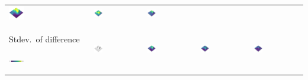 \documentclass[prodmode,acmtochi]{acmsmall} %
\begin{document}
\begin{table}
{\begin{tabular}{m{} m{} m{} m{} m{}}
\includegraphics[width=0.19\textwidth]{images/render_3d/stdev_dem_1.png} &
\includegraphics[width=0.19\textwidth]{images/render_3d/stdev_dem_2.png} &
\includegraphics[width=0.19\textwidth]{images/render_3d/stdev_dem_3.png}\\
%
Stdev.~of difference \par \vspace{0.5em} \includegraphics[width=0.19\textwidth]{images/legends/stdev_diff_legend.pdf} & 
\includegraphics[width=0.19\textwidth]{images/render_3d/dem_difference_1.png} &
\includegraphics[width=0.19\textwidth]{images/render_3d/stdev_regression_difference_series_1.png} &
\includegraphics[width=0.19\textwidth]{images/render_3d/stdev_regression_difference_series_2.png} &
\includegraphics[width=0.19\textwidth]{images/render_3d/stdev_regression_difference_series_3.png}\\

\end{tabular}}
\end{table}
\end{document}
